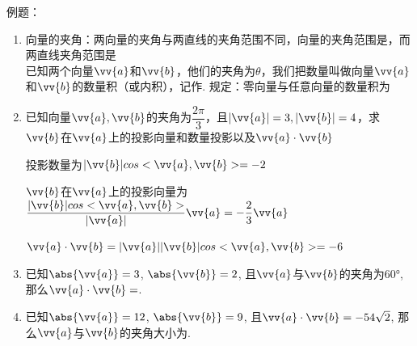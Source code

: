 例题：
\begin{enumerate}
    \item 向量的夹角：两向量的夹角与两直线的夹角范围不同，向量的夹角范围是\blkda{$[0, \pi]$}，而两直线夹角范围是\\
    已知两个向量$\vv{a}$和$\vv{b}$，他们的夹角为$\theta$，我们把数量叫做向量$\vv{a}$和$\vv{b}$的数量积（或内积），记作. 规定：零向量与任意向量的数量积为
    \item 已知向量$\vv{a}, \vv{b}$的夹角为$\dfrac{2\pi}{3}$，且$|\vv{a}| = 3, |\vv{b}| = 4$，求$\vv{b}$在$\vv{a}$上的投影向量和数量投影以及$\vv{a} \cdot \vv{b}$
    \begin{jieda}
        投影数量为$|\vv{b}|cos<\vv{a}, \vv{b}> = -2$
    
        $\vv{b}$在$\vv{a}$上的投影向量为$\dfrac{|\vv{b}|cos<\vv{a}, \vv{b}>}{|\vv{a}|}\vv{a} = -\dfrac{2}{3}\vv{a}$
        
        $\vv{a} \cdot \vv{b} = |\vv{a}||\vv{b}|cos<\vv{a}, \vv{b}> = -6$
    \end{jieda}
    \item 已知$\abs{\vv{a}}=3$, $\abs{\vv{b}}=2$, 且$\vv{a}$与$\vv{b}$的夹角为$\ang{60}$, 那么$\vv{a}\cdot\vv{b}=$. 
    
    \item 已知$\abs{\vv{a}}=12$, $\abs{\vv{b}}=9$, 且$\vv{a}\cdot\vv{b}=-54\sqrt{2}$, 那么$\vv{a}$与$\vv{b}$的夹角大小为. 


\end{enumerate}
